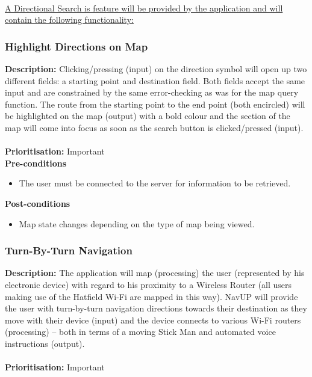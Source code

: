 \documentclass[runningheads,a4paper]{article}
\begin{document}

\noindent \\ \underline{A Directional Search is feature will be provided by the application and will contain the following functionality:}


\subsubsection{Highlight Directions on Map}

\textbf{Description:}  Clicking/pressing (input) on the direction symbol will open up two different fields: a starting point and destination field. Both fields accept the same input and are constrained by the same error-checking as was for the map query function.
The route from the starting point to the end point (both encircled) will be highlighted on the map (output) with a bold colour and the section of the map will come into focus as soon as the search button is clicked/pressed (input).\\\\
\noindent
\textbf{Prioritisation:} Important\\
  
  
\textbf{Pre-conditions}
\begin{itemize}
	\item The user must be connected to the server for information to be retrieved.
\end{itemize}
  
\textbf{Post-conditions}
\begin{itemize}
  	\item Map state changes depending on the type of map being viewed.
\end{itemize}

\subsubsection{Turn-By-Turn Navigation}

\textbf{Description:}  The application will map (processing) the user (represented by his electronic device) with regard to his proximity to a Wireless Router (all users making use of the Hatfield Wi-Fi are mapped in this way). NavUP will provide the user with turn-by-turn navigation directions towards their destination as they move with their device (input) and the device connects to various Wi-Fi routers (processing) – both in terms of a moving Stick Man and automated voice instructions (output).\\\\
\noindent
\textbf{Prioritisation:} Important\\
  
\end{document}
